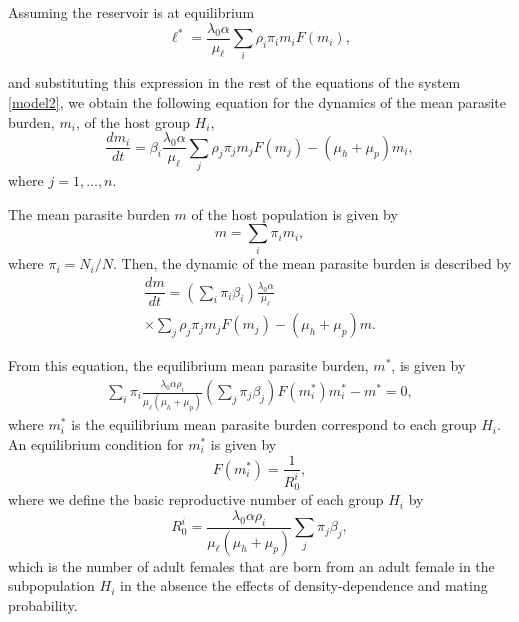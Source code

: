 \documentclass[eng]{MMSB-class-eng}
\begin{document}
Assuming the reservoir is at equilibrium 
\begin{equation}
\ell^*=\frac{  \lambda_0 \alpha }{\mu_{\ell}}   \sum_i \rho_{i} \pi_{i} m_{i} F(m_{i}), 
\end{equation} 
{\color{red}
and substituting this expression in the rest of the equations of the system \eqref{model2}, we obtain the following equation for the dynamics of the mean parasite burden, $m_{i}$, of the host group $H_{i}$,
\begin{equation}\label{dmi}
\dfrac{dm_{i}}{dt}=\beta_{i} \frac{\lambda_0\alpha}{ \mu_{\ell} }  
\sum_j     \rho_{j} \pi_j  m_{j} F(m_{j})
- (\mu_h+\mu_p) m_{i},
\end{equation}
where $j=1,\ldots,n$.

The mean parasite burden $m$ of the host population is given by
\begin{equation}
m=\sum_i \pi_i m_{i}, 
\end{equation}
where $\pi_i=N_i/N$.
Then, the dynamic of the mean parasite burden is described by
\begin{multline}
	\dfrac{dm}{dt}= %
	\left(  \sum_i \pi_i \beta_{i} \right)
	\frac{ \lambda_0 \alpha }{\mu_{\ell}}\\  
	\times \sum_j \rho_{j} \pi_{j} m_{j} F(m_{j})   -(\mu_{h}+\mu_p) m .%
\end{multline}

From this equation, the equilibrium mean parasite burden, $m^*$, is given by
\begin{multline}
	\sum_i \pi_i \frac{ \lambda_0 \alpha \rho_{i}}{\mu_{\ell}(\mu_{h}+\mu_p)} 
	\left( \sum_j \pi_{j} \beta_{j} \right)
	F( m^*_{i}) m^*_{i}
	- m^*=0, 
\end{multline}
where $m_{i}^*$ is the equilibrium mean parasite burden correspond to each group $H_{i}$.
An equilibrium condition for 
$m_{i}^*$
is given by
\begin{equation}%
F(m^*_{i})=\dfrac{1}{R_0^{i}},
\end{equation}
where we define the basic reproductive number of each group $H_i$ by
\begin{equation}%
R_0^{i}=\frac{ \lambda_0 \alpha \rho_{i}}{ \mu_{\ell} (\mu_{h}+\mu_p)}  \sum_j \pi_j\beta_{j} ,
\end{equation}
which is the number of adult females that are born from an adult female in the subpopulation $H_i$ in the absence the effects of density-dependence and  mating probability. 

}
\end{document}
